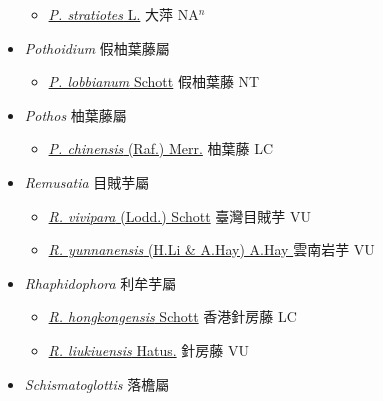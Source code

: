 \begin{itemize}
  \begin{itemize}
        \item[] \href{http://www.theplantlist.org/tpl1.1/search?q=Pistia+stratiotes}{\textit{P. stratiotes} L.}   大萍 NA$^n$
  \end{itemize}
 \item[] \textit{Pothoidium} 假柚葉藤屬
                    
  \begin{itemize}
        \item[] \href{http://www.theplantlist.org/tpl1.1/search?q=Pothoidium+lobbianum}{\textit{P. lobbianum} Schott}   假柚葉藤 NT
  \end{itemize}
 \item[] \textit{Pothos} 柚葉藤屬
                    
  \begin{itemize}
        \item[] \href{http://www.theplantlist.org/tpl1.1/search?q=Pothos+chinensis}{\textit{P. chinensis} (Raf.) Merr.}   柚葉藤 LC
  \end{itemize}
 \item[] \textit{Remusatia} 目賊芋屬
                    
  \begin{itemize}
        \item[] \href{http://www.theplantlist.org/tpl1.1/search?q=Remusatia+vivipara}{\textit{R. vivipara} (Lodd.) Schott}   臺灣目賊芋 VU
        \item[] \href{http://www.theplantlist.org/tpl1.1/search?q=Remusatia+yunnanensis}{\textit{R. yunnanensis} (H.Li \& A.Hay) A.Hay }   雲南岩芋 VU
  \end{itemize}
 \item[] \textit{Rhaphidophora} 利牟芋屬
                    
  \begin{itemize}
        \item[] \href{http://www.theplantlist.org/tpl1.1/search?q=Rhaphidophora+hongkongensis}{\textit{R. hongkongensis} Schott}   香港針房藤 LC
        \item[] \href{http://www.theplantlist.org/tpl1.1/search?q=Rhaphidophora+liukiuensis}{\textit{R. liukiuensis} Hatus.}   針房藤 VU
  \end{itemize}
 \item[] \textit{Schismatoglottis} 落檐屬
                    

\end{itemize}

